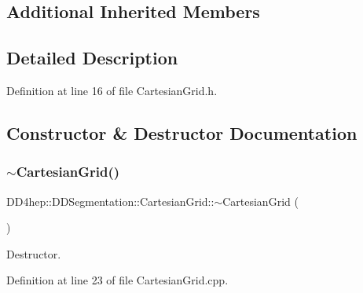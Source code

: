 \subsection*{Additional Inherited Members}


\subsection{Detailed Description}


Definition at line 16 of file Cartesian\+Grid.\+h.



\subsection{Constructor \& Destructor Documentation}
\hypertarget{class_d_d4hep_1_1_d_d_segmentation_1_1_cartesian_grid_a47e47796738c185cae95da0beb464913}{}\label{class_d_d4hep_1_1_d_d_segmentation_1_1_cartesian_grid_a47e47796738c185cae95da0beb464913} 
\subsubsection{\texorpdfstring{$\sim$\+Cartesian\+Grid()}{~CartesianGrid()}}
{\footnotesize\ttfamily D\+D4hep\+::\+D\+D\+Segmentation\+::\+Cartesian\+Grid\+::$\sim$\+Cartesian\+Grid (\begin{DoxyParamCaption}{ }\end{DoxyParamCaption})\hspace{0.3cm}{\ttfamily [virtual]}}



Destructor. 



Definition at line 23 of file Cartesian\+Grid.\+cpp.

\hypertarget{class_d_d4hep_1_1_d_d_segmentation_1_1_cartesian_grid_a12123b75c013fb62deb0877d923ba1e7}{}\label{class_d_d4hep_1_1_d_d_segmentation_1_1_cartesian_grid_a12123b75c013fb62deb0877d923ba1e7} 
